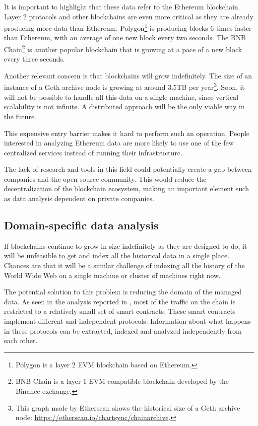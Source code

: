 It is important to highlight that these data refer to the Ethereum blockchain. Layer 2 protocols and other blockchains are even more critical as they are already producing more data than Ethereum. Polygon\footnote{Polygon is a layer 2 EVM blockchain based on Ethereum.} is producing blocks 6 times faster than Ethereum, with an average of one new block every two seconds. The BNB Chain\footnote{BNB Chain is a layer 1 EVM compatible blockchain developed by the Binance exchange.} is another popular blockchain that is growing at a pace of a new block every three seconds.

Another relevant concern is that blockchains will grow indefinitely. The size of an instance of a Geth archive node is growing at around 3.5TB per year\footnote{This graph made by Etherscan shows the historical size of a Geth archive node: \url{https://etherscan.io/chartsync/chainarchive}.}. Soon, it will not be possible to handle all this data on a single machine, since vertical scalability is not infinite. A distributed approach will be the only viable way in the future.

This expensive entry barrier makes it hard to perform such an operation. People interested in analyzing Ethereum data are more likely to use one of the few centralized services instead of running their infrastructure. 

The lack of research and tools in this field could potentially create a gap between companies and the open-source community. This would reduce the decentralization of the blockchain ecosystem, making an important element such as data analysis dependent on private companies.

\subsection{Domain-specific data analysis}

If blockchains continue to grow in size indefinitely as they are designed to do, it will be unfeasible to get and index all the historical data in a single place. Chances are that it will be a similar challenge of indexing all the history of the World Wide Web on a single machine or cluster of machines right now.

The potential solution to this problem is reducing the domain of the managed data. As seen in the analysis reported in , most of the traffic on the chain is restricted to a relatively small set of smart contracts. These smart contracts implement different and independent protocols. Information about what happens in these protocols can be extracted, indexed and analyzed independently from each other.

